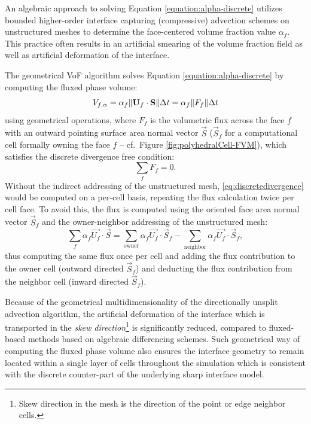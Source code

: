 An algebraic approach to solving Equation \ref{equation:alpha-discrete}
utilizes bounded higher-order interface capturing (compressive) advection 
schemes on unstructured meshes to determine the face-centered volume fraction 
value $\alpha_f$. This practice often results in an artificial smearing of 
the volume fraction field as well as artificial deformation of the interface. 

The geometrical VoF algorithm solves Equation \ref{equation:alpha-discrete} by
computing the fluxed phase volume: 
%
\begin{equation}
    V_{f,\alpha} = \alpha_{f} \| \mathbf U_f \cdot \mathbf S \| \Delta t = \alpha_f \| F_f \| \Delta t
    \label{equation:vol-phase-flux}
\end{equation}
%
using geometrical operations, where $F_f$ is the volumetric flux across the face
$f$ with an outward pointing surface area normal vector $\vec{S}$ 
($\vec{S}_f$ for a computational cell formally owning the face $f$ -- cf.\ Figure 
\ref{fig:polyhedralCell-FVM}), which satisfies the discrete divergence free condition: 
%
\begin{equation}
    \sum_f F_f = 0.
    \label{eq:discretedivergence}
\end{equation}
%
Without the indirect addressing of the unstructured mesh, \eqref{eq:discretedivergence} 
would be computed on a per-cell basis, repeating the flux calculation twice per cell 
face. To avoid this, the flux is computed using the oriented face area normal vector 
$\vec{S}_f$ and the owner-neighbor addressing of the unstructured mesh: 
%
\begin{equation}
   \sum_f \alpha_f \vec{U_f}\cdot\vec{S} = \sum_{\text{owner}} \alpha_f \vec{U_f}\cdot\vec{S}_f 
     - \sum_{\text{neighbor}} \alpha_f \vec{U_f}\cdot\vec{S}_f, 
   \label{equation:own-nei}
\end{equation}
%
thus computing the same flux once per cell and adding the flux contribution to
the owner cell (outward directed $\vec{S}_f$) and deducting the flux
contribution from the neighbor cell (inward directed $\vec{S}_f$). 

Because of the geometrical multidimensionality of the directionally
unsplit advection algorithm, the artificial deformation of the interface which
is transported in the \emph{skew direction}\footnote{Skew direction in the mesh
is the direction of the point or edge neighbor cells.} is significantly
reduced, compared to fluxed-based methods based on algebraic differencing schemes. 
Such geometrical way of computing the fluxed phase volume also ensures the 
interface geometry to remain located within a single layer of cells throughout 
the simulation which is consistent with the discrete counter-part of the underlying 
sharp interface model. 

